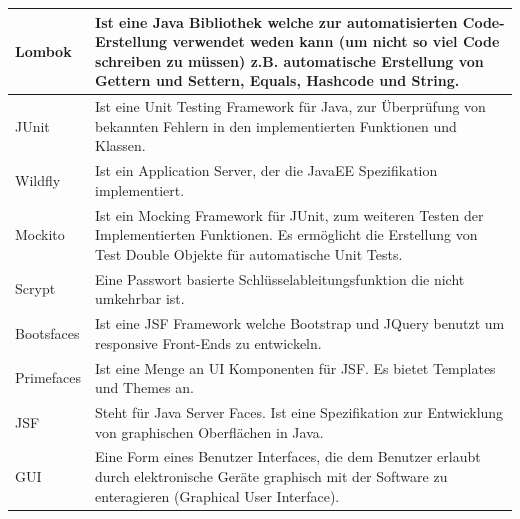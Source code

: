 \documentclass[enabledeprecatedfontcommands,fontsize=12pt,paper=a4,twoside]{scrartcl}
\begin{document}
\begin{longtable}[c]{|p{7cm}|p{8cm}|}
Lombok                                 & Ist eine Java Bibliothek welche zur automatisierten Code-Erstellung verwendet weden kann (um nicht so viel Code schreiben zu müssen) z.B. automatische Erstellung von Gettern und Settern, Equals, Hashcode und String. \\ \hline
JUnit                                  & Ist eine Unit Testing Framework für Java, zur Überprüfung von bekannten Fehlern in den implementierten Funktionen und Klassen.                                                                                          \\ \hline
Wildfly                                & Ist ein Application Server, der die JavaEE Spezifikation implementiert.                                                                                                                                                 \\ \hline
Mockito                                & Ist ein Mocking Framework für JUnit, zum weiteren Testen der Implementierten Funktionen. Es ermöglicht die Erstellung von Test Double Objekte für automatische Unit Tests.                                              \\ \hline
Scrypt                                 & Eine Passwort basierte Schlüsselableitungsfunktion die nicht umkehrbar ist.                                                                                                                                             \\ \hline
Bootsfaces                             & Ist eine JSF Framework welche Bootstrap und JQuery benutzt um responsive Front-Ends zu entwickeln.                                                                                                                      \\ \hline
Primefaces                             & Ist eine Menge an UI Komponenten für JSF. Es bietet Templates und Themes an.                                                                                                                                            \\ \hline
JSF                                    & Steht für Java Server Faces. Ist eine Spezifikation zur Entwicklung von graphischen Oberflächen in Java.                                                                                                                \\ \hline
GUI                                    & Eine Form eines Benutzer Interfaces, die dem Benutzer erlaubt durch elektronische Geräte graphisch mit der Software zu enteragieren (Graphical User Interface).                                                         \\ \hline

\end{longtable}
\end{document}
